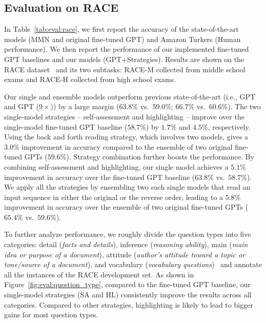 \documentclass[11pt,a4paper]{article}
\newcommand{\ie}{{i.e.}}
\newcommand{\vs}{{vs.}}
\begin{document}
\subsection{Evaluation on RACE}
\label{sec:eval:race}


In Table~\ref{tab:eval:race}, we first report the accuracy of the state-of-the-art models (MMN and original fine-tuned GPT) and Amazon Turkers (Human performance). We then report the performance of our implemented fine-tuned GPT baselines and our models (GPT+Strategies). Results are shown on the RACE dataset~\cite{lai2017race} and its two subtasks: RACE-M collected from middle school exams and RACE-H collected from high school exams.

Our single and ensemble models outperform previous state-of-the-art (\ie, GPT and GPT ($9\times $)) by a large margin ($63.8\%$ \vs~$59.0\%$; $66.7\%$ \vs~$60.6\%$). 
The two single-model strategies -- self-assessment and highlighting -- improve over the single-model fine-tuned GPT baseline ($58.7\%$) by $1.7\%$ and $4.5\%$, respectively. 
Using the back and forth reading strategy, which involves two models, gives a $3.0\%$ improvement in accuracy compared to the ensemble of two original fine-tuned GPTs  ($59.6\%$). Strategy combination further boosts the performance. By combining self-assessment and highlighting, our single
model achieves a $5.1\%$ improvement in accuracy over the fine-tuned GPT baseline ($63.8\%$ \vs~$58.7\%$). We apply all the strategies by ensembling two such single models that read an input sequence in either the original or the reverse order, leading to a $5.8\%$ improvement in accuracy over the ensemble of two original fine-tuned GPTs ($65.4\%$ \vs~$59.6\%$). 

To further analyze performance, we roughly divide the question types into five categories: detail (\emph{facts and details}), inference (\emph{reasoning ability}), main (\emph{main idea or purpose of a document}), attitude (\emph{author's attitude toward a topic or tone/source of a document}), and vocabulary (\emph{vocabulary questions})~\cite{qian2004evaluation,lai2017race} and annotate all the instances of the RACE development set. As shown in Figure~\ref{fig:eval:question_type}, compared to the fine-tuned GPT baseline, our single-model strategies (SA and HL) consistently improve the results across all categories. Compared to other strategies, highlighting is likely to lead to bigger gains for most question types.
\end{document}
